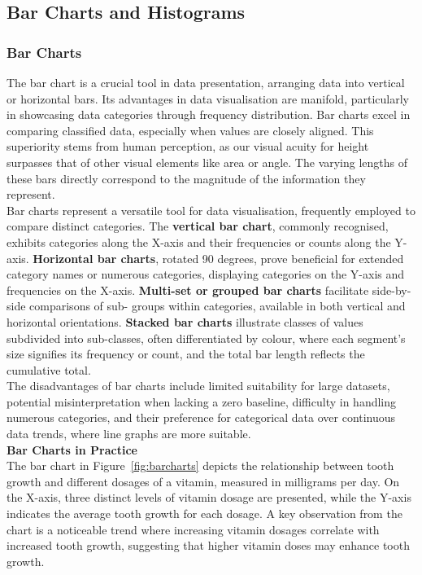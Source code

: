 \documentclass{article}\usepackage[]{graphicx}\usepackage[]{xcolor}
\begin{document}
\subsection{Bar Charts and Histograms}
\subsubsection{Bar Charts}
\noindent The bar chart is a crucial tool in data presentation, arranging data into vertical or horizontal bars. Its advantages in data visualisation are manifold, particularly in showcasing data categories through frequency distribution. Bar charts excel in comparing classified data, especially when values are closely aligned. This superiority stems from human perception, as our visual acuity for height surpasses that of other visual elements like area or angle. The varying lengths of these bars directly correspond to the magnitude of the information they represent.\\

\noindent Bar charts represent a versatile tool for data visualisation, frequently employed to compare distinct categories. The \textbf{vertical bar chart}, commonly recognised, exhibits categories along the X-axis and their frequencies or counts along the Y-axis. \textbf{Horizontal bar charts}, rotated 90 degrees, prove beneficial for extended category names or numerous categories, displaying categories on the Y-axis and frequencies on the X-axis. \textbf{Multi-set or grouped bar charts} facilitate side-by-side comparisons of sub- groups within categories, available in both vertical and horizontal orientations. \textbf{Stacked bar charts} illustrate classes of values subdivided into sub-classes, often differentiated by colour, where each segment's size signifies its frequency or count, and the total bar length reflects the cumulative total.\\

\noindent The disadvantages of bar charts include limited suitability for large datasets, potential misinterpretation when lacking a zero baseline, difficulty in handling numerous categories, and their preference for categorical data over continuous data trends, where line graphs are more suitable.\\

\noindent \textbf{Bar Charts in Practice}\\
\noident The bar chart in Figure~\ref{fig:barcharts} depicts the relationship between tooth growth and different dosages of a vitamin, measured in milligrams per day. On the X-axis, three distinct levels of vitamin dosage are presented, while the Y-axis indicates the average tooth growth for each dosage. A key observation from the chart is a noticeable trend where increasing vitamin dosages correlate with increased tooth growth, suggesting that higher vitamin doses may enhance tooth growth.
\end{document}
